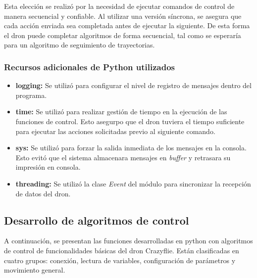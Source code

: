 Esta elección se realizó por la necesidad de ejecutar comandos de control de manera secuencial y confiable. Al utilizar una versión síncrona, se asegura que cada acción enviada sea completada antes de ejecutar la siguiente. De esta forma el dron puede completar algoritmos de forma secuencial, tal como se esperaría para un algoritmo de seguimiento de trayectorias.

\subsubsection{Recursos adicionales de Python utilizados}
\begin{itemize}
	\item \textbf{logging:} Se utilizó para configurar el nivel de registro de mensajes dentro del programa. 
	\item \textbf{time:} Se utilizó para realizar gestión de tiempo en la ejecución de las funciones de control. Esto asegurpo que el dron tuviera el tiempo suficiente para ejecutar las acciones solicitadas previo al siguiente comando.
	\item \textbf{sys:} Se utilizó para forzar la salida inmediata de los mensajes en la consola. Esto evitó que el sistema almacenara mensajes en \textit{buffer} y retrasara su impresión en consola.
	\item \textbf{threading:} Se utilizó la clase \textit{Event} del módulo para sincronizar la recepción de datos del dron.
\end{itemize} 

\subsection{Desarrollo de algoritmos de control}
A continuación, se presentan las funciones desarrolladas en python con algoritmos de control de funcionalidades básicas del dron Crazyflie. Están clasificadas en cuatro grupos: conexión, lectura de variables, configuración de parámetros y movimiento general.

